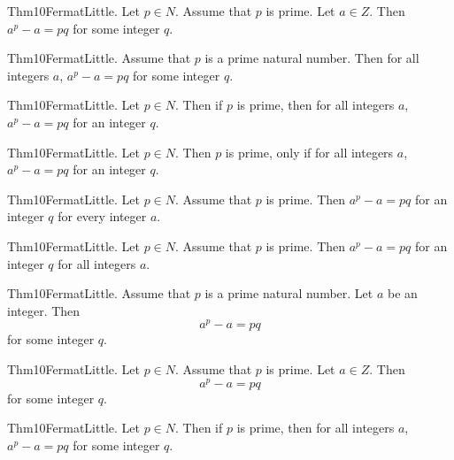 \documentclass{article}
\begin{document}
Thm10FermatLittle. Let $p \in N$. Assume that $p$ is prime. Let $a \in Z$. Then $a ^ {p}- a = p q$ for some integer $q$.

Thm10FermatLittle. Assume that $p$ is a prime natural number. Then for all integers $a$, $a ^ {p}- a = p q$ for some integer $q$.

Thm10FermatLittle. Let $p \in N$. Then if $p$ is prime, then for all integers $a$, $a ^ {p}- a = p q$ for an integer $q$.

Thm10FermatLittle. Let $p \in N$. Then $p$ is prime, only if for all integers $a$, $a ^ {p}- a = p q$ for an integer $q$.

Thm10FermatLittle. Let $p \in N$. Assume that $p$ is prime. Then $a ^ {p}- a = p q$ for an integer $q$ for every integer $a$.

Thm10FermatLittle. Let $p \in N$. Assume that $p$ is prime. Then $a ^ {p}- a = p q$ for an integer $q$ for all integers $a$.

Thm10FermatLittle. Assume that $p$ is a prime natural number. Let $a$ be an integer. Then $$a ^ {p}- a = p q$$ for some integer $q$.

Thm10FermatLittle. Let $p \in N$. Assume that $p$ is prime. Let $a \in Z$. Then $$a ^ {p}- a = p q$$ for some integer $q$.

Thm10FermatLittle. Let $p \in N$. Then if $p$ is prime, then for all integers $a$, $a ^ {p}- a = p q$ for some integer $q$.
\end{document}
